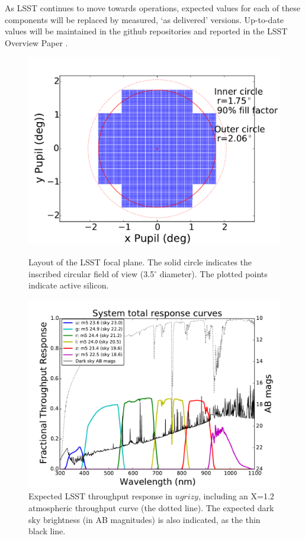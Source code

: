 \documentclass{iau}
\begin{document}
As LSST continues to move towards operations, expected values for each
of these components will be replaced by measured, `as delivered'
versions. Up-to-date values will be maintained in the github
repositories and reported in the LSST Overview Paper \cite{overviewpaper}.

\begin{figure}[htb]
\begin{minipage}{.5\textwidth}
\begin{center}
\includegraphics[width=0.9\linewidth]{focalplane}
\captionsetup{width=0.9\linewidth}
\caption{Layout of the LSST focal plane. The solid circle indicates
  the inscribed circular field of view (3.5$^\circ$ diameter). The
  plotted points indicate active silicon.\label{focalplane}}
\end{center}
\end{minipage}
\begin{minipage}{.5\textwidth}
\begin{center}
\includegraphics[width=0.9\linewidth]{throughputs}
\captionsetup{width=0.9\linewidth}
\caption{Expected LSST throughput response in $ugrizy$, including
  an X=1.2 atmospheric throughput curve (the dotted line). The
  expected dark sky brightness (in AB magnitudes) is also indicated,
  as the thin black line.\label{throughputs}}
\end{center}
\end{minipage}
\end{figure}
\end{document}
